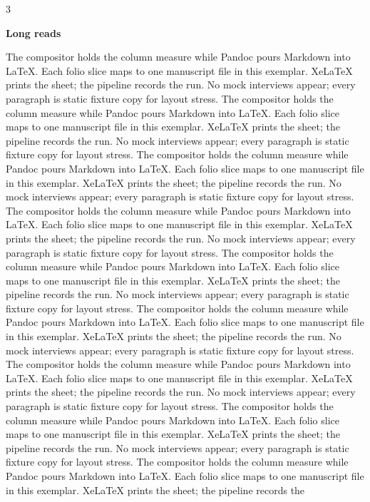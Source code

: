 \documentclass[
]{article}
\begin{document}
\begin{multicols}{3}

\textbf{Long reads}

The compositor holds the column measure while Pandoc pours Markdown into
LaTeX. Each folio slice maps to one manuscript file in this exemplar.
XeLaTeX prints the sheet; the pipeline records the run. No mock
interviews appear; every paragraph is static fixture copy for layout
stress. The compositor holds the column measure while Pandoc pours
Markdown into LaTeX. Each folio slice maps to one manuscript file in
this exemplar. XeLaTeX prints the sheet; the pipeline records the run.
No mock interviews appear; every paragraph is static fixture copy for
layout stress. The compositor holds the column measure while Pandoc
pours Markdown into LaTeX. Each folio slice maps to one manuscript file
in this exemplar. XeLaTeX prints the sheet; the pipeline records the
run. No mock interviews appear; every paragraph is static fixture copy
for layout stress. The compositor holds the column measure while Pandoc
pours Markdown into LaTeX. Each folio slice maps to one manuscript file
in this exemplar. XeLaTeX prints the sheet; the pipeline records the
run. No mock interviews appear; every paragraph is static fixture copy
for layout stress. The compositor holds the column measure while Pandoc
pours Markdown into LaTeX. Each folio slice maps to one manuscript file
in this exemplar. XeLaTeX prints the sheet; the pipeline records the
run. No mock interviews appear; every paragraph is static fixture copy
for layout stress. The compositor holds the column measure while Pandoc
pours Markdown into LaTeX. Each folio slice maps to one manuscript file
in this exemplar. XeLaTeX prints the sheet; the pipeline records the
run. No mock interviews appear; every paragraph is static fixture copy
for layout stress. The compositor holds the column measure while Pandoc
pours Markdown into LaTeX. Each folio slice maps to one manuscript file
in this exemplar. XeLaTeX prints the sheet; the pipeline records the
run. No mock interviews appear; every paragraph is static fixture copy
for layout stress. The compositor holds the column measure while Pandoc
pours Markdown into LaTeX. Each folio slice maps to one manuscript file
in this exemplar. XeLaTeX prints the sheet; the pipeline records the
run. No mock interviews appear; every paragraph is static fixture copy
for layout stress. The compositor holds the column measure while Pandoc
pours Markdown into LaTeX. Each folio slice maps to one manuscript file
in this exemplar. XeLaTeX prints the sheet; the pipeline records the

\end{multicols}
\end{document}
